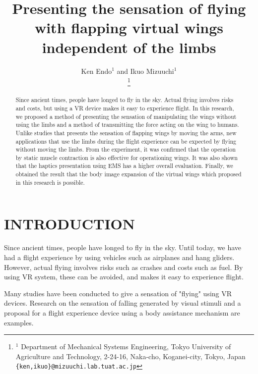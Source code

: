 \documentclass[letterpaper, 10 pt, conference]{ieeeconf}  %
\title{\LARGE \bf
        Presenting the sensation of flying with flapping virtual wings independent of the limbs
}
\author{Ken Endo$^{1}$ and Ikuo Mizuuchi$^{1}$%

        \thanks{$^{1}$ Department of Mechanical Systems Engineering, Tokyo University of Agriculture and Technology, 2-24-16, Naka-cho, Koganei-city, Tokyo, Japan
                {\tt\small \{ken,ikuo\}@mizuuchi.lab.tuat.ac.jp}}%
}
\begin{document}
\maketitle
\thispagestyle{empty}
\pagestyle{empty}


\begin{abstract}
        Since ancient times, people have longed to fly in the sky.  
        Actual flying involves risks and costs, but using a VR device makes it easy to experience flight.  
        In this research, we proposed a method of presenting the sensation of manipulating the wings without using the limbs and a method of transmitting the force acting on the wing to humans.  
        Unlike studies that presents the sensation of flapping wings by moving the arms, new applications that use the limbs during the flight experience can be expected by flying without moving the limbs.  
        From the experiment, it was confirmed that the operation by static muscle contraction is also effective for operationing wings.  
        It was also shown that the haptics presentation using EMS has a higher overall evaluation.  
        Finally, we obtained the result that the body image expansion of the virtual wings which proposed in this research is possible.
\end{abstract}


\section{INTRODUCTION}


        Since ancient times, people have longed to fly in the sky.  
        Until today, we have had a flight experience by using vehicles such as airplanes and hang gliders.  
        However, actual flying involves risks such as crashes and costs such as fuel.
        By using VR system, these can be avoided, and makes it easy to experience flight.  

        Many studies have been conducted to give a sensation of "flying" using VR devices.  
        Research on the sensation of falling generated by visual stimuli
        and a proposal for a flight experience device using a body assistance mechanism
        are examples.  
\end{document}
